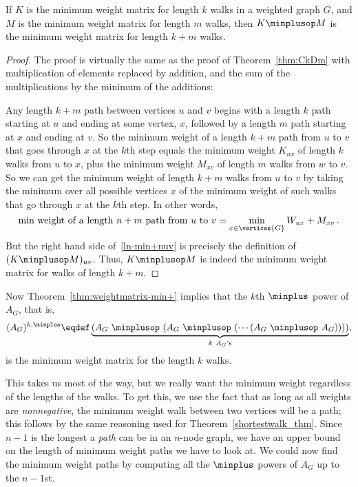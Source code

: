 \begin{theorem}\label{thm:weightmatrix-min+}
  If $K$ is the minimum weight matrix for length $k$ walks in a
  weighted graph $G$, and $M$ is the minimum weight matrix for length
  $m$ walks, then $K \minplusop M$ is the minimum weight matrix for
  length $k+m$ walks.
\end{theorem}

\begin{proof}
  The proof is virtually the same as the proof of Theorem~\ref{thm:CkDm}
  with multiplication of elements replaced by addition, and the sum of the
  multiplications by the minimum of the additions:

  Any length $k+m$ path between vertices $u$ and $v$ begins with a length
  $k$ path starting at $u$ and ending at some vertex, $x$, followed by a
  length $m$ path starting at $x$ and ending at $v$.  So the minimum
  weight of a length $k+m$ path from $u$ to $v$ that goes through $x$ at
  the $k$th step equals the minimum weight $K_{ux}$ of length $k$ walks
  from $u$ to $x$, plus the minimum weight $M_{xv}$ of length $m$ walks
  from $w$ to $v$.  So we can get the minimum weight of length $k+m$ walks
  from $u$ to $v$ by taking the minimum over all possible vertices $x$ of
  the minimum weight of such walks that go through $x$ at the $k$th step.
  In other words,
\begin{equation}\label{ln-min+nuv}
\text{min weight of a length $n+m$ path from $u$ to $v$} =
              \min_{x \in \vertices{G}} W_{ux}+M_{xv}\, .
\end{equation}
But the right hand side of~\eqref{ln-min+nuv} is precisely the
definition of $(K \minplusop M)_{uv}$.  Thus, $K \minplusop M$ is
indeed the minimum weight matrix for walks of length $k+m$.
\end{proof}

Now Theorem~\ref{thm:weightmatrix-min+} implies that the $k$th $\minplus$ power
of $A_G$, that is,
\[
(A_G)^{k, \minplus} \eqdef \underbrace{(A_G\ \minplusop\ (A_G\
      \minplusop\ (\cdots (A_G\ \minplusop\ A_G)) ))}_{k\ A_G\text{'s}},
\]
is the minimum weight matrix for the length $k$ walks.

This takes us most of the way, but we really want the minimum weight
regardless of the lengths of the walks.  To get this, we use the fact
that as long as all weights are \emph{nonnegative}, the minimum weight
walk between two vertices will be a path; this follows by the same
reasoning used for Theorem~\ref{shortestwalk_thm}.  Since $n-1$ is the
longest a \emph{path} can be in an $n$-node graph, we have an upper
bound on the length of minimum weight paths we have to look at.  We
could now find the minimum weight paths by computing all the
$\minplus$ powers of $A_G$ up to the $n-1$st.

